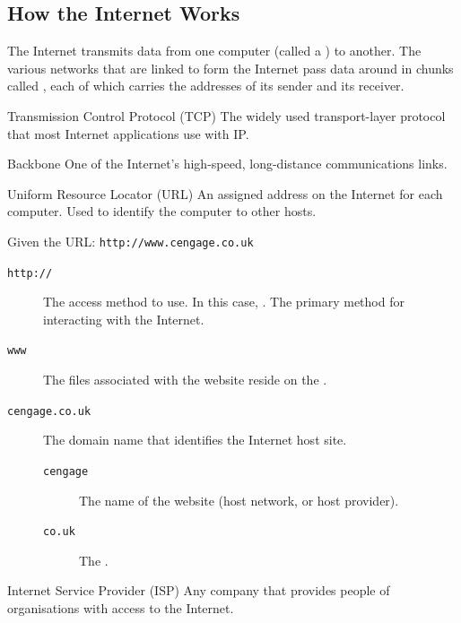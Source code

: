 \documentclass[\main/notes.tex]{subfiles}
\begin{document}
			\subsection{How the Internet Works}
				The Internet transmits data from one computer (called a ) to another. The various networks that are linked to form the Internet pass data around in chunks called , each of which carries the addresses of its sender and its receiver.
				\begin{definition}{Transmission Control Protocol (TCP)}
					The widely used transport-layer protocol that most Internet applications use with IP.
				\end{definition}
				\begin{definition}{Backbone}
					One of the Internet's high-speed, long-distance communications links.
				\end{definition}
				\begin{definition}{Uniform Resource Locator (URL)}
					An assigned address on the Internet for each computer. Used to identify the computer to other hosts.
					\begin{example}
						Given the URL: \texttt{http://www.cengage.co.uk}
						\begin{description}
							\item[\texttt{http://}] The access method to use. In this case, . The primary method for interacting with the Internet.
							\item[\texttt{www}] The files associated with the website reside on the .
							\item[\texttt{cengage.co.uk}] The domain name that identifies the Internet host site.
								\begin{description}
									\item[\texttt{cengage}] The name of the website (host network, or host provider).
									\item[\texttt{co.uk}] The .
								\end{description}
						\end{description}
					\end{example}
				\end{definition}
				\begin{definition}{Internet Service Provider (ISP)}
					Any company that provides people of organisations with access to the Internet.
				\end{definition}
\end{document}
